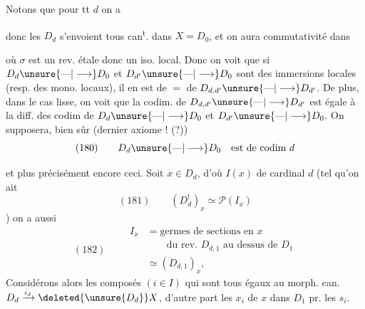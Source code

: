 Notons que pour tt $d$ on a

donc les $D_d$ s'envoient tous can\textsuperscript{t}. dans $X=D_0$, et on aura commutativité dans


où $\sigma$ est un rev. étale donc un iso. local. Donc on voit que si $D_d\unsure{\text{---}|\longrightarrow}D_0$ et $D_{d'}\unsure{\text{---}|\longrightarrow}D_0$ sont des immersions locales (resp. des mono. locaux), il en est de $=$ de $D_{d,d'}\unsure{\text{---}|\longrightarrow}D_{d'}$. De plus, dans le cas lisse, on voit que la codim. de $D_{d,d'}\unsure{\text{---}|\longrightarrow}D_{d'}$ est égale à la diff. des codim de $D_d\unsure{\text{---}|\longrightarrow}D_0$ et $D_{d'}\unsure{\text{---}|\longrightarrow}D_0$. On supposera, bien sûr (dernier axiome ! (?))
\[
(180)\qquad D_d\unsure{\text{---}|\longrightarrow}D_0\quad\text{est de codim }d
\]

 et plus précisément encore ceci. Soit  $x\in D_d$, d'où $I(x)$ de cardinal $d$ (tel qu'on ait
\[
(181)\qquad(D_d^!)_x\simeq\mathcal P(I_x)
\]
)
  on a aussi
\[
(182)\qquad\begin{aligned}
I_x&=\text{germes de sections en }x\\
&\qquad\text{du rev. }D_{d,1}\text{ au dessus de }D_1\\
&\simeq(D_{d,1})_x,
\end{aligned}
\]
Considérons alors les composés $(i\in I)$
qui sont tous égaux au morph. can. $D_d\xrightarrow{i_d}\deleted{\unsure{D_d}}X$, d'autre part les   $x_i$ de $x$ dans $D_1$ pr. les $s_i$.


